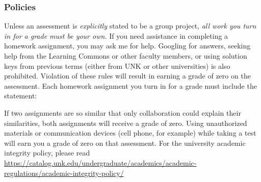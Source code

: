 \documentclass[12pt]{article}
\newcounter{ex}\setcounter{ex}{0}
\begin{document}
\subsubsection* {Policies}

Unless an assessment is \emph{explicitly} stated to be a group project,  \emph{all work you turn in for a grade must be your own.}  If you need assistance in completing a homework assignment, you may ask me for help. Googling for answers, seeking help from the Learning Commons or other faculty members,  or using solution keys from previous terms (either from UNK or other universities) is also prohibited.  Violation of these rules will result in earning a grade of zero on the assessment. Each homework assignment you turn in for a grade must include the statement:

\begin{quote}
\end{quote}
 If two assignments are so similar that only collaboration could explain their similarities, both assignments will receive a grade of zero.  Using unauthorized materials or communication devices (cell phone, for
example) while taking a test will earn you a grade of zero on that assessment.  
For the university academic integrity policy, please read
\small \url{https://catalog.unk.edu/undergraduate/academics/academic-regulations/academic-integrity-policy/}
 
\end{document}
